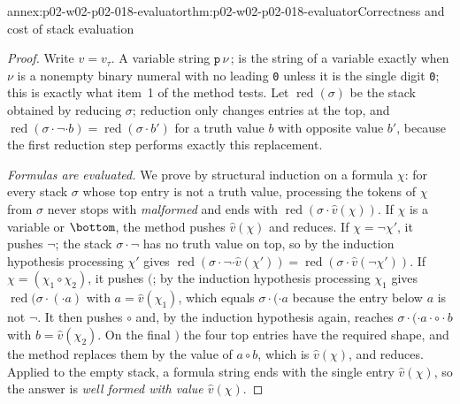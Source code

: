 \begin{annexitem}{annex:p02-w02-p02-018-evaluator}{thm:p02-w02-p02-018-evaluator}{Correctness and cost of stack evaluation}
\begin{proof}
Write \(v=v_\tau\).  A variable string \(\texttt{p}\,\nu\,\texttt{;}\) is the
string of a variable exactly when \(\nu\) is a nonempty binary numeral with no
leading \texttt{0} unless it is the single digit \texttt{0}; this is exactly
what item~1 of the method tests.  Let \(\operatorname{red}(\sigma)\) be the
stack obtained by reducing \(\sigma\); reduction only changes entries at the
top, and \(\operatorname{red}(\sigma\cdot\neg\cdot b)=
\operatorname{red}(\sigma\cdot b')\) for a truth value \(b\) with
opposite value \(b'\), because the first reduction step performs
exactly this replacement.

\emph{Formulas are evaluated.}  We prove by structural induction on a formula
\(\chi\): for every stack \(\sigma\) whose top entry is not a truth value,
processing the tokens of \(\chi\) from \(\sigma\) never stops with
\emph{malformed} and ends with \(\operatorname{red}(\sigma\cdot
\widehat v(\chi))\).  If \(\chi\) is a variable or \(\bottom\), the method
pushes \(\widehat v(\chi)\) and reduces.  If \(\chi=\neg\chi'\), it pushes
\(\neg\); the stack \(\sigma\cdot\neg\) has no truth value on top, so by the
induction hypothesis processing \(\chi'\) gives
\(\operatorname{red}(\sigma\cdot\neg\cdot\widehat v(\chi'))=
\operatorname{red}(\sigma\cdot\widehat v(\neg\chi'))\).  If
\(\chi=(\chi_1\circ\chi_2)\), it pushes \((\); by the induction hypothesis
processing \(\chi_1\) gives \(\operatorname{red}(\sigma\cdot(\cdot a)\) with
\(a=\widehat v(\chi_1)\), which equals \(\sigma\cdot(\cdot a\) because the
entry below \(a\) is not \(\neg\).  It then pushes \(\circ\) and, by the
induction hypothesis again, reaches \(\sigma\cdot(\cdot a\cdot\circ\cdot b\)
with \(b=\widehat v(\chi_2)\).  On the final \()\) the four top entries have
the required shape, and the method replaces them by the value of \(a\circ b\),
which is \(\widehat v(\chi)\), and reduces.  Applied to the empty stack, a
formula string ends with the single entry \(\widehat v(\chi)\), so the answer
is \emph{well formed with value \(\widehat v(\chi)\)}.


\end{proof}
\end{annexitem}
